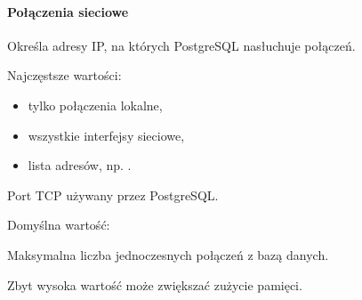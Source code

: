\documentclass[letterpaper,10pt,english]{sphinxmanual}
\begin{document}
\paragraph{Połączenia sieciowe}
\label{\detokenize{rozdzial_2/rozdzial_22/index:polaczenia-sieciowe}}\begin{description}
\sphinxAtStartPar
Określa adresy IP, na których PostgreSQL nasłuchuje połączeń.

\sphinxAtStartPar
Najczęstsze wartości:
\begin{itemize}
\item {} 
\sphinxAtStartPar
{} \textendash{} tylko połączenia lokalne,

\item {} 
\sphinxAtStartPar
\sphinxcode{\sphinxupquote{*}} \textendash{} wszystkie interfejsy sieciowe,

\item {} 
\sphinxAtStartPar
lista adresów, np. .

\end{itemize}

\sphinxAtStartPar
Port TCP używany przez PostgreSQL.

\sphinxAtStartPar
Domyślna wartość:

\begin{sphinxVerbatim}[commandchars=\\\{\}]
\end{sphinxVerbatim}

\sphinxAtStartPar
Maksymalna liczba jednoczesnych połączeń z bazą danych.

\sphinxAtStartPar
Zbyt wysoka wartość może zwiększać zużycie pamięci.

\end{description}
\end{document}
